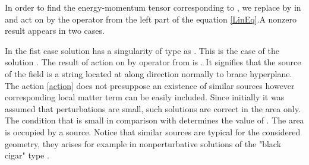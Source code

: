 \documentclass[letterpaper,12pt]{article}
\begin{document}
In order to find the energy-momentum tensor \coordHE{} corresponding to
\coordHE{}, we replace  \coordHE{} by \coordHE{} in  \coordHE{} and  act on  \coordHE{} by the
operator from the left part of the equation \eqref{LinEq}.A
nonzero result appears in two cases.

In the fist case solution has a singularity of \coordHE{} type as
\coordHE{}. This is the case of the solution \coordHE{}. The
result of action on \coordHE{} by operator \coordHE{} from
\coordHE{} is \coordHE{}. It signifies that the source of the
field is a string located at \coordHE{} along  \coordHE{}  direction normally
to brane hyperplane.  The action \eqref{action} does not
presuppose an existence of similar sources however corresponding
local matter term can be easily included. Since initially it was
assumed that perturbations are small, such solutions are correct
in the \coordHE{} area only. The condition that \coordHE{} is small in
comparison with \myHighlight{$\eta$}\coordHE{} determines the value of \coordHE{}. The area
\coordHE{} is occupied by a source. Notice that similar sources are
typical for the considered geometry, they arises for example  in
nonperturbative solutions of the "black cigar" type
\cite{Chamblin99}.
\end{document}
